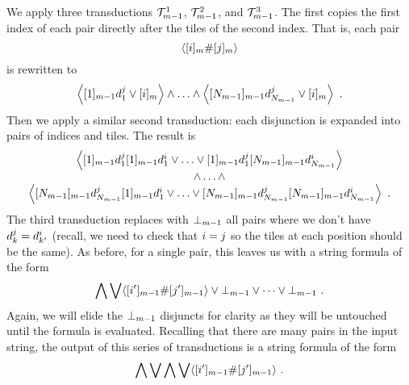 We apply three transductions $\psst^1_{\expheight-1}$,
$\psst^2_{\expheight-1}$, and $\psst^3_{\expheight-1}$. The first copies
the first index of each pair directly after the tiles of the second
index. That is, each pair
\[
    \lmark \tenc{\expheight}{\idxi} \spacer \tenc{\expheight}{\idxj} \rmark
\]
is rewritten to
\[
    \fbrac{
        \tenc{\expheight-1}{1} \vartile^\idxj_1
        \lor
        \tenc{\expheight}{\idxi}
    }
    \land
    \ldots
    \land
    \fbrac{
        \tenc{\expheight-1}{\nmax{\expheight-1}}
            \vartile^\idxj_{\nmax{\expheight-1}}
        \lor
        \tenc{\expheight}{\idxi}
    } \ .
\]
Then we apply a similar second transduction: each disjunction is
expanded into pairs of indices and tiles. The result is
\[
    \begin{array}{c}
        \fbrac{
            \tenc{\expheight-1}{1} \vartile^\idxj_1
            \tenc{\expheight-1}{1} \vartile^\idxi_1
            \lor
            \ldots
            \lor
            \tenc{\expheight-1}{1} \vartile^\idxj_1
            \tenc{\expheight-1}{\nmax{\expheight-1}}
                \vartile^\idxi_{\nmax{\expheight-1}}
        } \\
        \land
        \ldots
        \land \\
        \fbrac{
            \tenc{\expheight-1}{\nmax{\expheight-1}}
                \vartile^\idxj_{\nmax{\expheight-1}}
            \tenc{\expheight-1}{1} \vartile^\idxi_1
            \lor
            \ldots
            \lor
            \tenc{\expheight-1}{\nmax{\expheight-1}}
                \vartile^\idxj_{\nmax{\expheight-1}}
            \tenc{\expheight-1}{\nmax{\expheight-1}}
                \vartile^\idxi_{\nmax{\expheight-1}}
        } \ .
    \end{array}
\]
The third transduction replaces with $\sffalse{\expheight-1}$ all pairs where
we don't have $\vartile^\idxj_\idxk = \vartile^\idxi_{\idxk'}$ (recall, we need
to check that $\idxi = \idxj$ so the tiles at each position should be the
same). As before, for a single pair, this leaves us with a string formula of
the form
\[
    \bigwedge \bigvee \lmark
        \tenc{\expheight-1}{\idxi'} \spacer \tenc{\expheight-1}{\idxj'}
    \rmark
    \lor \sffalse{\expheight-1} \lor \cdots \lor \sffalse{\expheight-1} \ .
\]
Again, we will elide the $\sffalse{\expheight-1}$ disjuncts for clarity as they
will be untouched until the formula is evaluated.  Recalling that there are
many pairs in the input string, the output of this series of transductions is a
string formula of the form
\[
    \bigwedge \bigvee \bigwedge \bigvee \lmark
        \tenc{\expheight-1}{\idxi'} \spacer \tenc{\expheight-1}{\idxj'}
    \rmark \ .
\]

